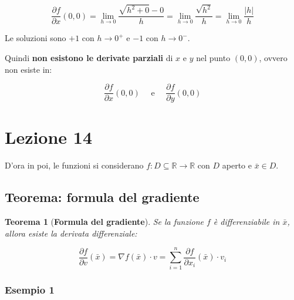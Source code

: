 \documentclass[a4paper]{article}
\newtheorem{theorem}{Teorema}
\begin{document}
	\begin{equation*}
		\dfrac{\partial f}{\partial x}\left(0,0\right) = \lim_{h \rightarrow 0} \dfrac{\sqrt{h^{2} + 0} - 0}{h} = \lim_{h \rightarrow 0} \dfrac{\sqrt{h^{2}}}{h} = \lim_{h \rightarrow 0} \dfrac{\left|h\right|}{h}
	\end{equation*}

	\noindent
	Le soluzioni sono $+1$ con $h \rightarrow 0^{+}$ e $-1$ con $h \rightarrow 0^{-}$.\newline
	
	\noindent
	Quindi \textbf{non esistono le derivate parziali} di $x$ e $y$ nel punto $\left(0,0\right)$, ovvero non esiste in:
	
	\begin{equation*}
		\dfrac{\partial f}{\partial x}\left(0,0\right) \hspace{1em} \text{ e } \hspace{1em} \dfrac{\partial f}{\partial y}\left(0,0\right)
	\end{equation*}

	\newpage
	
	\section{Lezione 14}
	
	D'ora in poi, le funzioni si considerano $f: D \subseteq \mathbb{R} \longrightarrow \mathbb{R}$ con $D$ aperto e $\bar{x} \in D$.
	
	\subsection[Teorema: formula del gradiente]{\textcolor{Red3}{Teorema: formula del gradiente}}
	
	\begin{theorem}[\textbf{Formula del gradiente}]
		Se la funzione $f$ è differenziabile in $\bar{x}$, allora esiste la derivata differenziale:
		
		\begin{equation*}
			\dfrac{\partial f}{\partial v}\left(\bar{x}\right) = \nabla f\left(\bar{x}\right) \cdot v = \sum_{i = 1}^{n} \dfrac{\partial f}{\partial x_{i}} \left(\bar{x}\right) \cdot v_{i}
		\end{equation*}
	\end{theorem}

	\subsubsection[Esempio 1]{\textcolor{Green4}{Esempio 1}}
	
\end{document}
